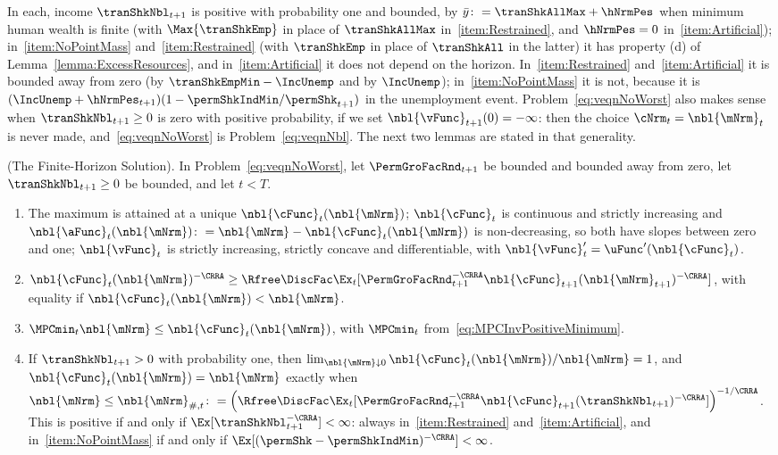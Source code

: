 \documentclass[\econtexRoot/BufferStockTheory]{subfiles}
\begin{document}
In each, income $\tranShkNbl_{t+1}$ is positive with probability one and bounded, by $\bar{y}\colon=\tranShkAllMax+\hNrmPes$ when minimum human wealth is finite (with $\Max{\tranShkEmp}$ in place of $\tranShkAllMax$ in~\ref{item:Restrained}, and $\hNrmPes=0$ in~\ref{item:Artificial}); in~\ref{item:NoPointMass} and~\ref{item:Restrained} (with $\tranShkEmp$ in place of $\tranShkAll$ in the latter) it has property (d) of Lemma~\ref{lemma:ExcessResources}, and in~\ref{item:Artificial} it does not depend on the horizon.
In~\ref{item:Restrained} and~\ref{item:Artificial} it is bounded away from zero (by $\tranShkEmpMin-\IncUnemp$ and by $\IncUnemp$); in~\ref{item:NoPointMass} it is not, because it is $(\IncUnemp+\hNrmPes_{t+1})(1-\permShkIndMin/\permShk_{t+1})$ in the unemployment event.
Problem~\eqref{eq:veqnNoWorst} also makes sense when $\tranShkNbl_{t+1}\geq 0$ is zero with positive probability, if we set $\nbl{\vFunc}_{t+1}(0)=-\infty$: then the choice $\cNrm_{t}=\nbl{\mNrm}_{t}$ is never made, and~\eqref{eq:veqnNoWorst} is Problem~\eqref{eq:veqnNbl}.
The next two lemmas are stated in that generality.

\begin{lemma}(The Finite-Horizon Solution).\label{lemma:NoWorstFinite}
In Problem~\eqref{eq:veqnNoWorst}, let $\PermGroFacRnd_{t+1}$ be bounded and bounded away from zero, let $\tranShkNbl_{t+1}\geq 0$ be bounded, and let $t<T$.
\begin{enumerate}[label=(\roman*)]
\item The maximum is attained at a unique $\nbl{\cFunc}_{t}(\nbl{\mNrm})$; $\nbl{\cFunc}_{t}$ is continuous and strictly increasing and $\nbl{\aFunc}_{t}(\nbl{\mNrm})\colon=\nbl{\mNrm}-\nbl{\cFunc}_{t}(\nbl{\mNrm})$ is non-decreasing, so both have slopes between zero and one; $\nbl{\vFunc}_{t}$ is strictly increasing, strictly concave and differentiable, with $\nbl{\vFunc}_{t}^{\prime}=\uFunc^{\prime}(\nbl{\cFunc}_{t})$.
\item $\nbl{\cFunc}_{t}(\nbl{\mNrm})^{-\CRRA}\geq\Rfree\DiscFac\Ex_{t}[\PermGroFacRnd_{t+1}^{-\CRRA}\nbl{\cFunc}_{t+1}(\nbl{\mNrm}_{t+1})^{-\CRRA}]$, with equality if $\nbl{\cFunc}_{t}(\nbl{\mNrm})<\nbl{\mNrm}$.
\item $\MPCmin_{t}\nbl{\mNrm}\leq\nbl{\cFunc}_{t}(\nbl{\mNrm})$, with $\MPCmin_{t}$ from~\eqref{eq:MPCInvPositiveMinimum}.
\item If $\tranShkNbl_{t+1}>0$ with probability one, then $\lim_{\nbl{\mNrm}\downarrow 0}\nbl{\cFunc}_{t}(\nbl{\mNrm})/\nbl{\mNrm}=1$, and $\nbl{\cFunc}_{t}(\nbl{\mNrm})=\nbl{\mNrm}$ exactly when $\nbl{\mNrm}\leq\nbl{\mNrm}_{\#,t}\colon=\left(\Rfree\DiscFac\Ex_{t}[\PermGroFacRnd_{t+1}^{-\CRRA}\nbl{\cFunc}_{t+1}(\tranShkNbl_{t+1})^{-\CRRA}]\right)^{-1/\CRRA}$.
This is positive if and only if $\Ex[\tranShkNbl_{t+1}^{-\CRRA}]<\infty$: always in~\ref{item:Restrained} and~\ref{item:Artificial}, and in~\ref{item:NoPointMass} if and only if $\Ex[(\permShk-\permShkIndMin)^{-\CRRA}]<\infty$.
\end{enumerate}
\end{lemma}
\end{document}
